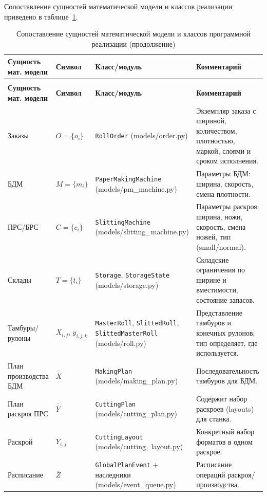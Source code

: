  Сопоставление сущностей математической модели и классов реализации приведено в таблице~\ref{tab:model_mapping}.
\begin{longtable}{|p{3.4cm}|p{3.2cm}|p{4.2cm}|p{4.2cm}|}
    \caption{Сопоставление сущностей математической модели и классов программной реализации}\label{tab:model_mapping}\\
    \hline
    \textbf{Сущность мат.
модели} & \textbf{Символ} & \textbf{Класс/модуль} & \textbf{Комментарий} \\
    \hline
    \endfirsthead
    \caption[]{Сопоставление сущностей математической модели и классов программной реализации (продолжение)}\\
    \hline
    \textbf{Сущность мат.
модели} & \textbf{Символ} & \textbf{Класс/модуль} & \textbf{Комментарий} \\
    \hline
    \endhead
    \hline
    \endfoot
    Заказы & $O=\{o_i\}$ & \texttt{RollOrder} (models/order.py) & Экземпляр заказа с шириной, количеством, плотностью, маркой, слоями и сроком исполнения.\\
    \hline
    БДМ & $M=\{m_i\}$ & \texttt{PaperMakingMachine} (models/pm\_machine.py) & Параметры БДМ: ширина, скорость, смена плотности.\\
    \hline
    ПРС/БРС & $C=\{c_i\}$ & \texttt{SlittingMachine} (models/slitting\_machine.py) & Параметры раскроя: ширина, ножи, скорость, смена ножей, тип (small/normal).\\
    \hline
    Склады & $T=\{t_i\}$ & \texttt{Storage}, \texttt{StorageState} (models/storage.py) & Складские ограничения по ширине и вместимости, состояние запасов.\\
    \hline
    Тамбуры/рулоны & $X_{i,j}$, $y_{i,j,k}$ & \texttt{MasterRoll}, \texttt{SlittedRoll}, \texttt{SlittedMasterRoll} (models/roll.py) & Представление тамбуров и конечных рулонов; тип определяет, где используется.\\
    \hline
    План производства БДМ & $\overline{\overline{X}}$ & \texttt{MakingPlan} (models/making\_plan.py) & Последовательность тамбуров для БДМ.\\
    \hline
    План раскроя ПРС & $\overline{\overline{Y}}$ & \texttt{CuttingPlan} (models/cutting\_plan.py) & Содержит набор раскроев (layouts) для станка.\\
    \hline
    Раскрой & $Y_{i,j}$ & \texttt{CuttingLayout} (models/cutting\_layout.py) & Конкретный набор форматов в одном раскрое.\\
    \hline
    Расписание & $\overline{\overline{Z}}$ & \texttt{GlobalPlanEvent} + наследники (models/event\_queue.py) & Расписание операций раскроя/производства.\\

\end{longtable}
